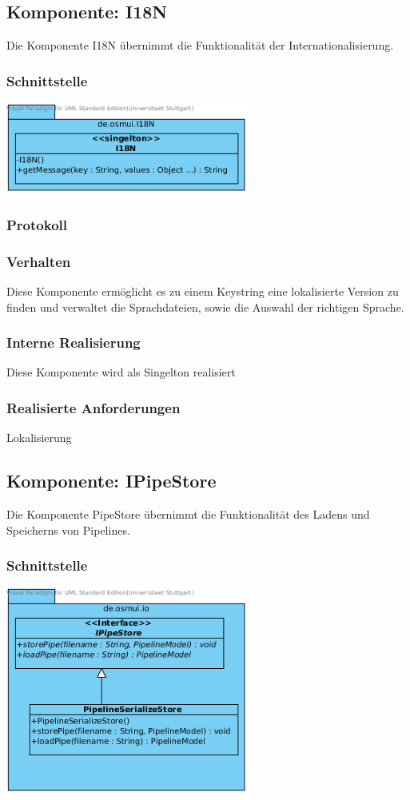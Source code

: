\documentclass[a4paper,12pt]{scrartcl}
\begin{document}
\subsection{Komponente: I18N}
Die Komponente I18N übernimmt die Funktionalität der Internationalisierung.
\subsubsection{Schnittstelle}
\begin{center}
\includegraphics[width=8cm]{Schnittstelle_I18N.png}
\end{center}
\subsubsection{Protokoll}
\subsubsection{Verhalten}
Diese Komponente ermöglicht es zu einem Keystring eine lokalisierte Version zu finden und verwaltet die Sprachdateien, sowie die Auswahl der richtigen Sprache.
\subsubsection{Interne Realisierung}
Diese Komponente wird als Singelton realisiert
\subsubsection{Realisierte Anforderungen}
Lokalisierung

\subsection{Komponente: IPipeStore}
Die Komponente PipeStore übernimmt die Funktionalität des Ladens und Speicherns von Pipelines.
\subsubsection{Schnittstelle}
\begin{center}
\includegraphics[width=8cm]{Schnittstelle_IPipeStore.png}
\end{center}
\end{document}
